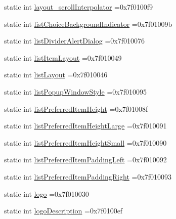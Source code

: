 \begin{DoxyCompactItemize}
\item 
static int \hyperlink{classandroid_1_1support_1_1graphics_1_1drawable_1_1R_1_1attr_ad2de38c43ba99f4a6a4593b677b75d1d}{layout\+\_\+scroll\+Interpolator} =0x7f0100f9
\item 
static int \hyperlink{classandroid_1_1support_1_1graphics_1_1drawable_1_1R_1_1attr_a91d0d99c123a306e3e752f91e9db2993}{list\+Choice\+Background\+Indicator} =0x7f01009b
\item 
static int \hyperlink{classandroid_1_1support_1_1graphics_1_1drawable_1_1R_1_1attr_a4b5797b34a74f031954741f47d631794}{list\+Divider\+Alert\+Dialog} =0x7f010076
\item 
static int \hyperlink{classandroid_1_1support_1_1graphics_1_1drawable_1_1R_1_1attr_a8a60e51b2a8631f9bf63cfd972d09138}{list\+Item\+Layout} =0x7f010049
\item 
static int \hyperlink{classandroid_1_1support_1_1graphics_1_1drawable_1_1R_1_1attr_aa76f332ba6dd9ef67af13566ec75047d}{list\+Layout} =0x7f010046
\item 
static int \hyperlink{classandroid_1_1support_1_1graphics_1_1drawable_1_1R_1_1attr_a5cddd57ca81a460de00b824bd98b89b8}{list\+Popup\+Window\+Style} =0x7f010095
\item 
static int \hyperlink{classandroid_1_1support_1_1graphics_1_1drawable_1_1R_1_1attr_a46f627dadecb425617fddd3e6db002b4}{list\+Preferred\+Item\+Height} =0x7f01008f
\item 
static int \hyperlink{classandroid_1_1support_1_1graphics_1_1drawable_1_1R_1_1attr_a20b74adeb5bcb1e8de72ece6d879f44d}{list\+Preferred\+Item\+Height\+Large} =0x7f010091
\item 
static int \hyperlink{classandroid_1_1support_1_1graphics_1_1drawable_1_1R_1_1attr_afb78c67eaaebccb22148e87d0d3290a7}{list\+Preferred\+Item\+Height\+Small} =0x7f010090
\item 
static int \hyperlink{classandroid_1_1support_1_1graphics_1_1drawable_1_1R_1_1attr_a81120041ceb924b07988c476b520ddbd}{list\+Preferred\+Item\+Padding\+Left} =0x7f010092
\item 
static int \hyperlink{classandroid_1_1support_1_1graphics_1_1drawable_1_1R_1_1attr_ab19c3cac3672677eb3d50b1d9e22c771}{list\+Preferred\+Item\+Padding\+Right} =0x7f010093
\item 
static int \hyperlink{classandroid_1_1support_1_1graphics_1_1drawable_1_1R_1_1attr_ad69b32b28458b691063de4943a44ad22}{logo} =0x7f010030
\item 
static int \hyperlink{classandroid_1_1support_1_1graphics_1_1drawable_1_1R_1_1attr_aadbf0b7bd04bedc28b0f0c8375db17b9}{logo\+Description} =0x7f0100ef

\end{DoxyCompactItemize}
